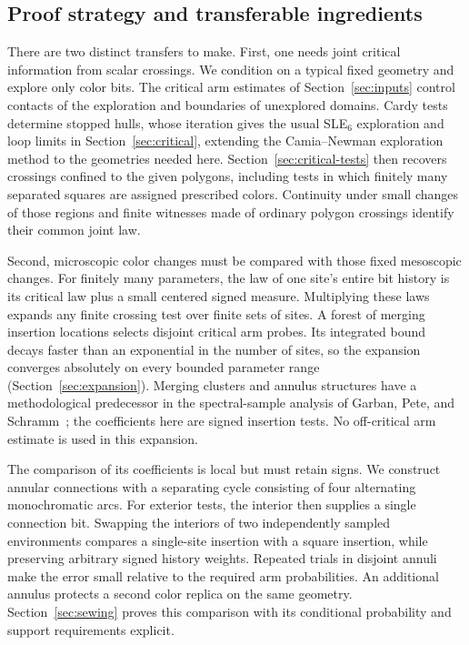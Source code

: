 \subsection{Proof strategy and transferable ingredients}

There are two distinct transfers to make. First, one needs joint
critical information from scalar crossings. We condition on a typical
fixed geometry and explore only color bits. The critical arm estimates
of Section~\ref{sec:inputs} control contacts of the exploration and
boundaries of unexplored domains. Cardy tests determine stopped hulls,
whose iteration gives the usual SLE$_6$ exploration and loop limits
in Section~\ref{sec:critical}, extending the Camia--Newman exploration
method to the geometries needed here. Section~\ref{sec:critical-tests}
then recovers crossings confined to the given polygons, including tests
in which finitely many separated squares are assigned prescribed colors.
Continuity under small changes of those regions and finite witnesses
made of ordinary polygon crossings identify their common joint law.

Second, microscopic color changes must be compared with those fixed
mesoscopic changes. For finitely many parameters, the law of one site's
entire bit history is its critical law plus a small centered signed
measure. Multiplying these laws expands any finite crossing test over
finite sets of sites. A forest of merging insertion locations selects
disjoint critical arm probes. Its integrated bound decays faster than
an exponential in the number of sites, so the expansion converges
absolutely on every bounded parameter range
(Section~\ref{sec:expansion}). Merging clusters and annulus structures
have a methodological predecessor in the spectral-sample analysis of
Garban, Pete, and Schramm~\cite[Section~4]{gps-fourier}; the coefficients
here are signed insertion tests. No off-critical arm estimate is used
in this expansion.

The comparison of its coefficients is local but must retain signs.
We construct annular connections with a separating cycle consisting
of four alternating monochromatic arcs. For exterior tests, the
interior then supplies a single connection bit. Swapping the interiors
of two independently sampled environments compares a single-site
insertion with a square insertion, while preserving arbitrary signed
history weights. Repeated trials in disjoint annuli make the error
small relative to the required arm probabilities. An additional
annulus protects a second color replica on the same geometry.
Section~\ref{sec:sewing} proves this comparison with its conditional
probability and support requirements explicit.

